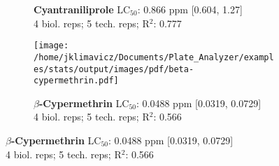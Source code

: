 \documentclass{article}
\begin{document}
\begin{figure}[thp!]
\begin{subfigure}{0.500\textwidth}
      \vspace{-0.05cm}
      \caption*{\textbf{Cyantraniliprole} LC$_{50}$: 0.866 ppm [0.604, 1.27] \\ 
4 biol. reps; 5 tech. reps; R$^2$: 0.777}
      \vspace{0.1cm}
   \end{subfigure}%
   \begin{subfigure}{0.500\textwidth}
      \centering
      \texttt{[image: /home/jklimavicz/Documents/Plate\_Analyzer/examples/stats/output/images/pdf/beta-cypermethrin.pdf]}
      \vspace{-0.05cm}
      \caption*{\textbf{$\beta$-Cypermethrin} LC$_{50}$: 0.0488 ppm [0.0319, 0.0729] \\ 
4 biol. reps; 5 tech. reps; R$^2$: 0.566}
      \vspace{0.1cm}
   \end{subfigure}%
\end{figure}
\clearpage
\pagebreak
\vspace{-0.1cm}
\end{document}
